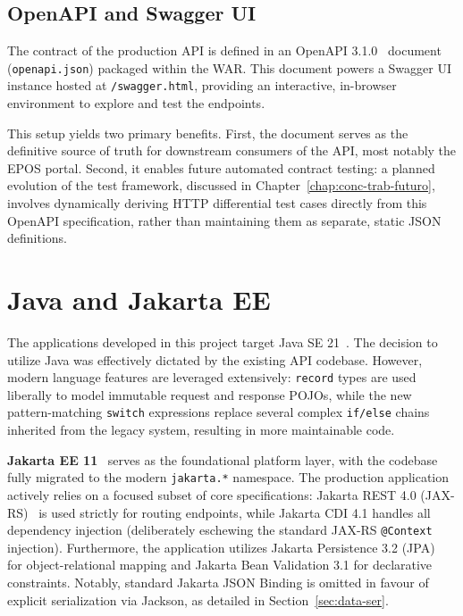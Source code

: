 \subsection{OpenAPI and Swagger UI}

The contract of the production \ac{API} is defined in an \ac{OpenAPI} 3.1.0~\cite{openapi}
document (\texttt{openapi.json}) packaged within the \ac{WAR}. This
document powers a Swagger \ac{UI}~\cite{swaggerui} instance hosted at \texttt{/swagger.html},
providing an interactive, in-browser environment to explore and test the
endpoints.

This setup yields two primary benefits. First, the document serves as the
definitive source of truth for downstream consumers of the \ac{API}, most
notably the \ac{EPOS} portal. Second, it enables future automated contract testing:
a planned evolution of the test framework, discussed in Chapter~\ref{chap:conc-trab-futuro},
involves dynamically deriving \ac{HTTP} differential test cases directly from
this \ac{OpenAPI} specification, rather than maintaining them as separate,
static \ac{JSON} definitions.

\section{Java and Jakarta EE}
\label{sec:java}

The applications developed in this project target Java SE 21~\cite{javaSE21}.
The decision to utilize Java was effectively dictated by the existing \ac{API}
codebase. However, modern language features are leveraged extensively: \texttt{record}
types are used liberally to model immutable request and response \acp{POJO},
while the new pattern-matching \texttt{switch} expressions replace several complex
\texttt{if/else} chains inherited from the legacy system, resulting in more maintainable
code.

\textbf{Jakarta EE 11}~\cite{jakartaee} serves as the foundational platform
layer, with the codebase fully migrated to the modern \texttt{jakarta.*}
namespace. The production application actively relies on a focused subset of
core specifications: Jakarta \ac{REST} 4.0 (\ac{JAX-RS})~\cite{jaxrs} is
used strictly for routing endpoints, while Jakarta \ac{CDI} 4.1 handles all
dependency injection (deliberately eschewing the standard JAX-RS \texttt{@Context}
injection). Furthermore, the application utilizes Jakarta Persistence 3.2 (\ac{JPA})~\cite{jpa}
for object-relational mapping and Jakarta Bean Validation 3.1 for
declarative constraints. Notably, standard Jakarta JSON Binding is omitted
in favour of explicit serialization via Jackson, as detailed in Section~\ref{sec:data-ser}.

